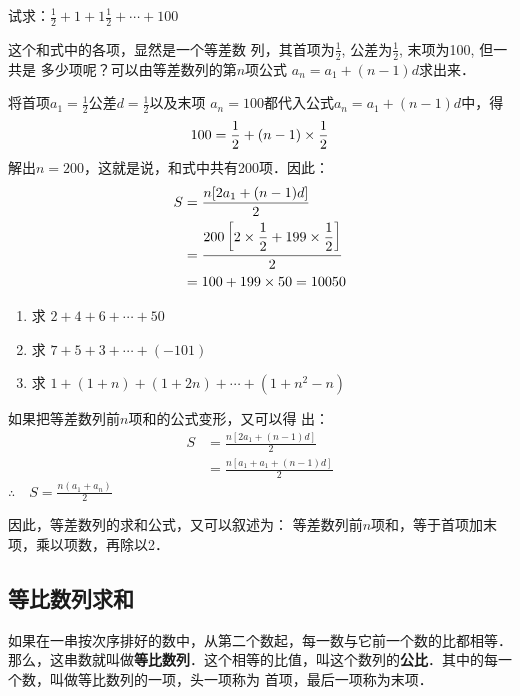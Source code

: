 \begin{example}
    试求：$\frac{1}{2}+1+1\frac{1}{2}+\cdots+100$
\end{example}

\begin{analyze}
这个和式中的各项，显然是一个等差数
列，其首项为$\frac{1}{2}$, 公差为$\frac{1}{2}$,
末项为100, 但一共是
多少项呢？可以由等差数列的第$n$项公式 $a_n=a_1+(n-1)d$求出来．

\end{analyze}

\begin{solution}
将首项$a_1=\frac{1}{2}$公差$d=\frac{1}{2}$以及末项
$a_n=100$都代入公式$a_n=a_1+(n-1)d$中，得
\[100=\dfrac{1}{2}+(n-1)\times \dfrac{1}{2}\]
解出$n=200$，这就是说，和式中共有200项．因此：
\[\begin{split}
    S&=\dfrac{n[2a_1+(n-1)d]}{2}\\
    &=\dfrac{200\left[2\times\dfrac{1}{2}+199\times \dfrac{1}{2}\right]}{2}\\
    &=100+199\times 50=10050
\end{split}\]
\end{solution}

\begin{ex}
\begin{enumerate}
    \item 求 $2+4+6+\cdots+50$
    \item 求 $7+5+3+\cdots+(-101)$
    \item 求 $1+(1+n)+(1+2n)+\cdots+(1+n^2-n)$
\end{enumerate}
\end{ex}

如果把等差数列前$n$项和的公式变形，又可以得
出：
\[\begin{split}
    S&=\frac{n[2a_1+(n-1)d]}{2}\\
    &=\frac{n[a_1+a_1+(n-1)d]}{2}
\end{split}\]
$\therefore\quad S=\frac{n(a_1+a_n)}{2}$

因此，等差数列的求和公式，又可以叙述为：
等差数列前$n$项和，等于首项加末项，乘以项数，再除以2．

\subsection{等比数列求和}
如果在一串按次序排好的数中，从第二个数起，每一数与它前一个数的比都相等．那么，这串数就叫做\textbf{等比数列}．这个相等的比值，叫这个数列的\textbf{公比}．其中的每一个数，叫做等比数列的一项，头一项称为
首项，最后一项称为末项．

